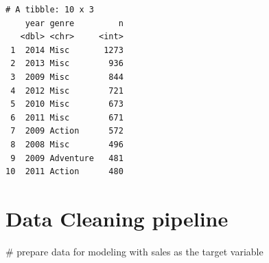 \documentclass[
  letterpaper,
  DIV=11,
  numbers=noendperiod]{scrartcl}
\newenvironment{Shaded}{\begin{snugshade}}{\end{snugshade}}
\newcommand{\CommentTok}[1]{\textcolor[rgb]{0.37,0.37,0.37}{#1}}
\begin{document}
\begin{verbatim}
# A tibble: 10 x 3
    year genre         n
   <dbl> <chr>     <int>
 1  2014 Misc       1273
 2  2013 Misc        936
 3  2009 Misc        844
 4  2012 Misc        721
 5  2010 Misc        673
 6  2011 Misc        671
 7  2009 Action      572
 8  2008 Misc        496
 9  2009 Adventure   481
10  2011 Action      480
\end{verbatim}

\hypertarget{data-cleaning-pipeline}{%
\section{Data Cleaning pipeline}\label{data-cleaning-pipeline}}

\begin{Shaded}
\begin{Highlighting}[]
\CommentTok{\# prepare data for modeling with sales as the target variable}



\end{Highlighting}
\end{Shaded}
\end{document}

